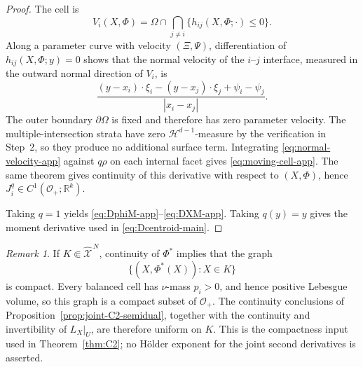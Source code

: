 \documentclass[11pt]{article}
\def\R{\mathbb{R}}
\def\Oc{{\mathcal O}}
\def\Xc{{\mathcal X}}
\def\hX{\widehat{\Xc}^{\,N}}
\newcommand{\HH}{\mathcal H}
\theoremstyle{definition}
\theoremstyle{remark}
\newtheorem{remark}[theorem]{Remark}
\numberwithin{equation}{section}
\begin{document}
\begin{proof}
The cell is
\[
 V_i(X,\Phi)=\Omega\cap\bigcap_{j\ne i}\{h_{ij}(X,\Phi;\cdot)\le0\}.
\]
Along a parameter curve with velocity $(\Xi,\Psi)$, differentiation of
$h_{ij}(X,\Phi;y)=0$ shows that the normal velocity of the $i$--$j$ interface, measured in the
outward normal direction of $V_i$, is
\begin{equation}\label{eq:normal-velocity-app}
 \frac{(y-x_i)\cdot\xi_i-(y-x_j)\cdot\xi_j+
 \psi_i-\psi_j}{|x_i-x_j|}.
\end{equation}
The outer boundary $\partial\Omega$ is fixed and therefore has zero parameter velocity.  The
multiple-intersection strata have zero $\HH^{d-1}$-measure by the verification in Step~2, so they
produce no additional surface term.  Integrating \eqref{eq:normal-velocity-app} against $q\rho$ on
each internal facet gives \eqref{eq:moving-cell-app}.  The same theorem gives continuity of this
derivative with respect to $(X,\Phi)$, hence $J_i^q\in C^1(\Oc_+;\R^k)$.

Taking $q=1$ yields \eqref{eq:DphiM-app}--\eqref{eq:DXM-app}.  Taking $q(y)=y$ gives the moment
derivative used in \eqref{eq:Dcentroid-main}.
\end{proof}


\begin{remark}\label{rem:compact-C2}
If $K\Subset\hX$, continuity of $\Phi^*$ implies that the graph
\[
 \{(X,\Phi^*(X)):X\in K\}
\]
is compact.  Every balanced cell has $\nu$-mass $p_i>0$, and hence positive Lebesgue volume, so this
graph is a compact subset of $\Oc_+$.  The continuity conclusions of
Proposition~\ref{prop:joint-C2-semidual}, together with the continuity and invertibility of
$L_X|_U$, are therefore uniform on $K$.  This is the compactness input used in
Theorem~\ref{thm:C2}; no H\"older exponent for the joint second derivatives is asserted.
\end{remark}
\end{document}

